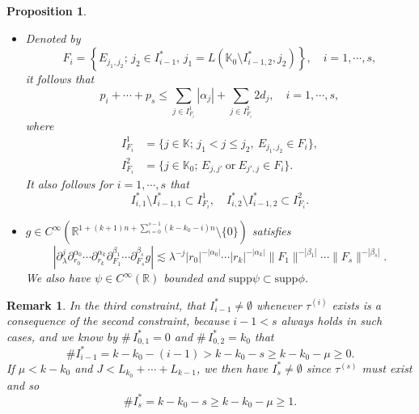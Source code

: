 \documentclass[11pt,reqno]{amsart}
\newtheorem{proposition}[theorem]{Proposition}
\newtheorem{remark}[theorem]{Remark}
\numberwithin{equation}{section}
\theoremstyle{definition}
\begin{document}
\begin{proposition}
\begin{itemize}
		
		\item[(4)] Denoted by
		\begin{equation}\label{defF_i}
			F_i=\left\{E_{j_1,j_2};\,j_2\in I_{i-1}^*,\,j_1=L(\mathbb{K}_0\setminus I_{i-1,2}^*,j_2)\right\},\quad i=1,\cdots,s,
		\end{equation}
		it follows that
		\begin{equation}\label{stepmuconstraint4}
			p_i+\cdots+p_s\leq\sum_{j\in I_{F_i}^1}|\alpha_j|+\sum_{j\in I_{F_i}^2}2d_j,\quad i=1,\cdots,s,
		\end{equation}
		where
		\begin{equation}\label{defI_F12}
			\begin{split}
				I_{F_i}^1&=\{j\in\mathbb{K};\,j_1<j\leq j_2,~E_{j_1,j_2}\in F_i\},\\
				I_{F_i}^2&=\{j\in\mathbb{K}_0;\,E_{j,j'}~\text{or}~E_{j',j}\in F_i\}.
			\end{split}
		\end{equation}
		It also follows for $i=1,\cdots,s$ that
		\begin{equation}\label{I_i^*I_F^}
			I_{i,1}^*\setminus I_{i-1,1}^*\subset I_{F_i}^1,\quad I_{i,2}^*\setminus I_{i-1,2}^*\subset I_{F_i}^2.
		\end{equation}
		
		\item[(5)] $g\in C^\infty(\mathbb{R}^{1+(k+1)n+\sum_{i=0}^{s-1}(k-k_0-i)n}\setminus\{0\})$ satisfies
		\begin{equation}\label{Pvariables}
			|\partial_\lambda^j\partial_{r_0}^{\alpha_0}\cdots\partial_{r_k}^{\alpha_k}\partial_{F_1}^{\beta_1}\cdots\partial_{F_s}^{\beta_s}g|\lesssim\lambda^{-j}|r_0|^{-|\alpha_0|}\cdots|r_k|^{-|\alpha_k|}\|F_1\|^{-|\beta_1|}\cdots\|F_s\|^{-|\beta_s|}.
		\end{equation}
		We also have $\psi\in C^\infty(\mathbb{R})$ bounded and $\mathrm{supp}\psi\subset\mathrm{supp}\phi$.
	\end{itemize}
\end{proposition}

\begin{remark}\label{stepmuproprk1}
	In the third constraint, that $I_{i-1}^*\neq\emptyset$ whenever $\tau^{(i)}$ exists is a consequence of the second constraint, because $i-1<s$ always holds in such cases, and we know by $\#\,I_{0,1}^*=0$ and $\#\,I_{0,2}^*=k_0$ that
	\begin{equation*}
		\#I_{i-1}^*=k-k_0-(i-1)>k-k_0-s\geq k-k_0-\mu\geq0.
	\end{equation*}
	If $\mu<k-k_0$ and $J<L_{k_0}+\cdots+L_{k-1}$, we then have $I_s^*\neq\emptyset$ since $\tau^{(s)}$ must exist and so
	\begin{equation*}
		\# I_s^*=k-k_0-s\geq k-k_0-\mu\geq1.
	\end{equation*}
\end{remark}
\end{document}
